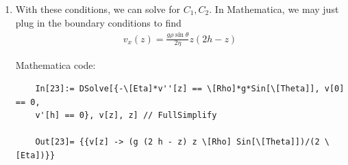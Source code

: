 \documentclass{article}
\theoremstyle{definition}
\newcommand{\f}[2]{\frac{#1}{#2}}
\begin{document}
\begin{enumerate}[label=(\alph*)]
	\item With these conditions, we can solve for $C_1, C_2$. In Mathematica, we may just plug in the boundary conditions to find 
	\begin{align*}
	\boxed{v_x(z) = \f{g\rho \sin\theta}{2\eta}  z(2h-z)  }
	\end{align*}
	
	Mathematica code:
	\begin{lstlisting}
	In[23]:= DSolve[{-\[Eta]*v''[z] == \[Rho]*g*Sin[\[Theta]], v[0] == 0, 
	v'[h] == 0}, v[z], z] // FullSimplify
	
	Out[23]= {{v[z] -> (g (2 h - z) z \[Rho] Sin[\[Theta]])/(2 \[Eta])}}
	\end{lstlisting}
\end{enumerate}













\newpage
\end{document}
